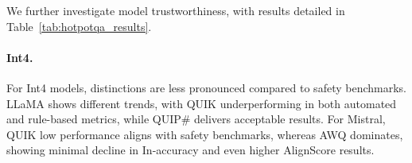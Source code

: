 \begin{table}[t!]
    \centering

    \caption{Evaluation of models trustworthiness with HotPotQA.}
    \label{tab:hotpotqa_results}
\end{table}

We further investigate model trustworthiness, with results detailed in Table~\ref{tab:hotpotqa_results}.

\paragraph{Int4.}
For Int4 models, distinctions are less pronounced compared to safety benchmarks. LLaMA shows different trends, with QUIK underperforming in both automated and rule-based metrics, while QUIP\# delivers acceptable results. For Mistral, QUIK low performance aligns with safety benchmarks, whereas AWQ dominates, showing minimal decline in In-accuracy and even higher AlignScore results.

